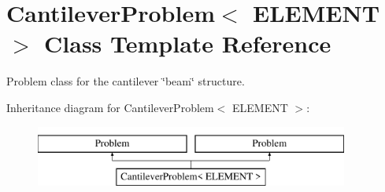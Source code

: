 \hypertarget{classCantileverProblem}{}\section{Cantilever\+Problem$<$ E\+L\+E\+M\+E\+NT $>$ Class Template Reference}
\label{classCantileverProblem}


Problem class for the cantilever \char`\"{}beam\char`\"{} structure.  


Inheritance diagram for Cantilever\+Problem$<$ E\+L\+E\+M\+E\+NT $>$\+:\begin{figure}[H]
\begin{center}
\leavevmode
\includegraphics[height=2.000000cm]{classCantileverProblem}
\end{center}
\end{figure}
